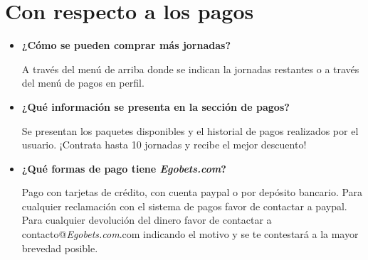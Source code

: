 \section{Con respecto a los pagos}
\begin{itemize}

\item \textbf{¿Cómo se pueden comprar más jornadas?}


A través del menú de arriba donde se indican la jornadas restantes o a través del menú de pagos en perfil.

\item \textbf{¿Qué información se presenta en la sección de pagos?}


Se presentan los paquetes disponibles y el historial de pagos realizados por el usuario. ¡Contrata hasta 10 jornadas y recibe el mejor descuento!

\item \textbf{¿Qué formas de pago tiene \emph{Egobets.com}?}


Pago con tarjetas de crédito, con cuenta paypal o por depósito bancario. Para cualquier reclamación con el sistema de pagos favor de contactar a paypal. Para cualquier devolución del dinero favor de contactar a contacto@\emph{Egobets.com}.com indicando el motivo y se te contestará a la mayor brevedad posible.
\end{itemize}

